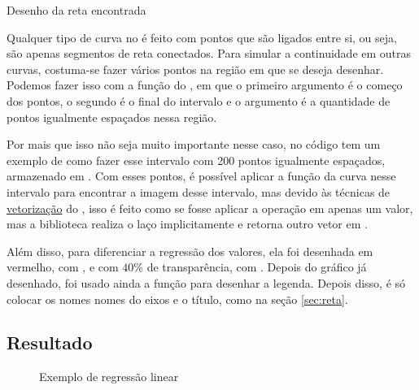     \begin{listing}[H]
        \caption{Desenho da reta encontrada}
        \label{code:regres:plot}

    \end{listing}

    Qualquer tipo de curva no \matplotlib é feito com pontos que são ligados entre si, ou seja, são apenas segmentos de reta conectados. Para simular a continuidade em outras curvas, costuma-se fazer vários pontos na região em que se deseja desenhar. Podemos fazer isso com a função  do \numpy, em que o primeiro argumento é o começo dos pontos, o segundo é o final do intervalo e o argumento  é a quantidade de pontos igualmente espaçados nessa região.

    Por mais que isso não seja muito importante nesse caso, no código tem um exemplo de como fazer esse intervalo com 200 pontos igualmente espaçados, armazenado em . Com esses pontos, é possível aplicar a função da curva nesse intervalo para encontrar a imagem desse intervalo, mas devido às técnicas de \href{https://realpython.com/numpy-array-programming/\#what-is-vectorization}{vetorização} do \numpy, isso é feito como se fosse aplicar a operação em apenas um valor, mas a biblioteca realiza o laço implicitamente e retorna outro vetor em .

    Além disso, para diferenciar a regressão dos valores, ela foi desenhada em vermelho, com , e com $40\%$ de transparência, com . Depois do gráfico já desenhado, foi usado ainda a função  para desenhar a legenda. Depois disso, é só colocar os nomes nomes do eixos e o título, como na seção \ref{sec:reta}.


\subsection{Resultado}

    \begin{figure}[H]
        \centering
        

        \caption{Exemplo de regressão linear}
        \label{fig:regres:resultado}
    \end{figure}

